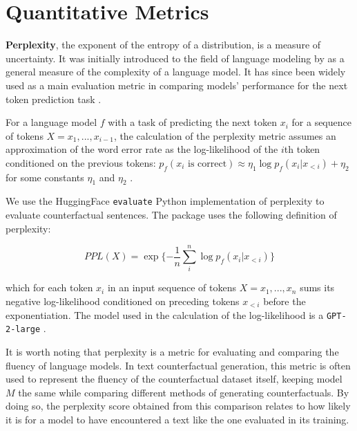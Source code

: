 \documentclass[11pt]{article}
\begin{document}


\appendix

\section{Quantitative Metrics}\label{appendix:metrics-implementation}

\textbf{Perplexity}, the exponent of the entropy of a distribution, is a measure of uncertainty. It was initially introduced to the field of language modeling by \citet{jelinek_perplexitymeasure_1977} as a general measure of the complexity of a language model. It has since been widely used as a main evaluation metric in comparing models' performance for the next token prediction task \cite{liu_roberta_2019, meister_language_2021}. 

For a language model $f$ with a task of predicting the next token $x_i$ for a sequence of tokens $X = x_1, ..., x_{i-1}$, the calculation of the perplexity metric assumes an approximation of the word error rate as the log-likelihood of the $i$th token conditioned on the previous tokens: $p_f(x_i \text{ is correct}) \approx \eta_1 \log p_f(x_i|x_{<i}) + \eta_2$ for some constants $\eta_1$ and $\eta_2$ \cite{chen_evaluation_2008}.

We use the HuggingFace \texttt{evaluate} \cite{von_werra_evaluate_2022} Python implementation of perplexity to evaluate counterfactual sentences. The package uses the following definition of perplexity:

\begin{equation*}
    PPL(X) = \exp \{ - \frac{1}{n} \sum^n_i \log p_f(x_i|x_{<i}) \}
\end{equation*}

which for each token $x_i$ in an input sequence of tokens $X = x_1, ..., x_n$ sums its negative log-likelihood conditioned on preceding tokens $x_{<i}$ before the exponentiation. The model used in the calculation of the log-likelihood is a \texttt{GPT-2-large} \cite{radford_language_2019}.

It is worth noting that perplexity is a metric for evaluating and comparing the fluency of language models. In text counterfactual generation, this metric is often used to represent the fluency of the counterfactual dataset itself, keeping model $M$ the same while comparing different methods of generating counterfactuals. By doing so, the perplexity score obtained from this comparison relates to how likely it is for a model to have encountered a text like the one evaluated in its training.
\end{document}
